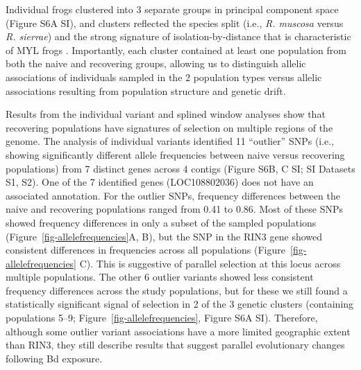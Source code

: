 \documentclass[9pt,twocolumn,twoside,lineno]{pnas-new}
\begin{document}
Individual frogs clustered into 3 separate groups in principal component
space (Figure S6A SI), and clusters reflected
the species split (i.e., \emph{R. muscosa} versus \emph{R. sierrae}) and
the strong signature of isolation-by-distance that is characteristic of
MYL frogs \citep{rothstein2020, poorten2017, byrne2023}. Importantly,
each cluster contained at least one population from both the naive and
recovering groups, allowing us to distinguish allelic associations of
individuals sampled in the 2 population types versus allelic
associations resulting from population structure and genetic drift.

Results from the individual variant and splined window analyses show
that recovering populations have signatures of selection on multiple
regions of the genome. The analysis of individual variants identified 11
``outlier'' SNPs (i.e., showing significantly different allele
frequencies between naive versus recovering populations) from 7 distinct
genes across 4 contigs (Figure S6B, C SI; SI
Datasets S1, S2). One of the 7 identified genes (LOC108802036) does not
have an associated annotation. For the outlier SNPs, frequency
differences between the naive and recovering populations ranged from
0.41 to 0.86. Most of these SNPs showed frequency differences in only a
subset of the sampled populations (Figure~\ref{fig-allelefrequencies}A,
B), but the SNP in the RIN3 gene showed consistent differences in
frequencies across all populations (Figure~\ref{fig-allelefrequencies}
C). This is suggestive of parallel selection at this locus across
multiple populations. The other 6 outlier variants showed less
consistent frequency differences across the study populations, but for
these we still found a statistically significant signal of selection in
2 of the 3 genetic clusters (containing populations 5--9;
Figure~\ref{fig-allelefrequencies}, Figure S6A
SI). Therefore, although some outlier variant associations have a more
limited geographic extent than RIN3, they still describe results that
suggest parallel evolutionary changes following Bd exposure.
\end{document}

